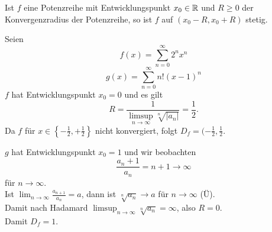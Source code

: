\begin{subcorollary}
	Ist $ f $ eine Potenzreihe mit Entwicklungspunkt $ x_0 \in \mathbb{R}  $ und $ R \geq 0 $ der Konvergenzradius der Potenzreihe, so ist $ f $ auf $ ( x_0 - R, x_0 + R ) $ stetig.
\end{subcorollary}

\begin{subexample}
	Seien
	\[
		f(x) = \sum_{n=0}^{\infty} 2^n x^n
	\]
	\[
		g(x) = \sum_{n=0}^{\infty} n!(x - 1)^n
	\]
	$ f $ hat Entwicklungspunkt $ x_0 = 0 $ und es gilt
	\[
		R = \frac{ 1 }{ \limsup_{n \to \infty} \sqrt[n]{\left| a_n \right| } } = \frac{ 1 }{ 2 } .
	\]
	Da $ f $ für $ x \in \left\{ -\frac{ 1 }{ 2 } , + \frac{ 1 }{ 2 }  \right\}  $ nicht konvergiert, folgt $ D_f = (-\frac{ 1 }{ 2 }, \frac{ 1 }{ 2 }  $.

	$ g $ hat Entwicklungspunkt $ x_0 = 1 $ und wir beobachten
	\[
		\frac{ a_n + 1 }{ a_n } =n + 1 \to \infty
	\]
	für $ n \to \infty $.\\
	Ist $ \lim_{n \to \infty} \frac{ a_{n+1} }{ a_n } = a $, dann ist $ \sqrt[n]{a_n} \to a $ für $ n \to \infty $ (Ü).\\
	Damit nach Hadamard $ \limsup_{n \to \infty} \sqrt[n]{a_n} = \infty $, also $ R = 0 $.\\
	Damit $ D_f = {1} $.
\end{subexample}

